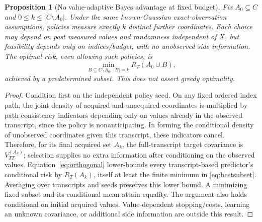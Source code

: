 \documentclass{article}
\newtheorem{proposition}{Proposition}
\begin{document}
\begin{proposition}[No value-adaptive Bayes advantage at fixed budget]\label{prop:adaptive}
Fix $A_0\subseteq C$ and $0\leq k\leq|C\setminus A_0|$. Under the same known-Gaussian exact-observation assumptions, policies measure exactly $k$ distinct further coordinates. Each choice may depend on past measured values and randomness independent of $X$, but feasibility depends only on indices/budget, with no unobserved side information. The optimal risk, even allowing such policies, is
\begin{equation}
 \min_{B\subseteq C\setminus A_0,\ |B|=k}R_T(A_0\cup B),
 \label{eq:bestsubset}
\end{equation}
achieved by a predetermined subset. This does not assert greedy optimality.
\end{proposition}
\begin{proof}
Condition first on the independent policy seed. On any fixed ordered index path, the joint density of acquired and unacquired coordinates is multiplied by path-consistency indicators depending only on values already in the observed transcript, since the policy is nonanticipating. In forming the conditional density of unobserved coordinates given this transcript, these indicators cancel. Therefore, for its final acquired set $A_k$, the full-transcript target covariance is $V^{(A_k)}_{TT}$; selection supplies no extra information after conditioning on the observed values. Equation~\eqref{eq:orthogonal} lower-bounds every transcript-based predictor's conditional risk by $R_T(A_k)$, itself at least the finite minimum in \eqref{eq:bestsubset}. Averaging over transcripts and seeds preserves this lower bound. A minimizing fixed subset and its conditional mean attain equality. The argument also holds conditional on initial acquired values. Value-dependent stopping/costs, learning an unknown covariance, or additional side information are outside this result.
\end{proof}
\end{document}
